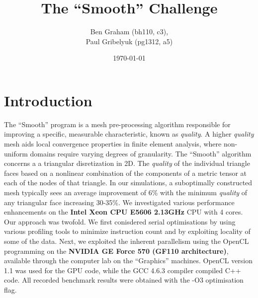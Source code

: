 \documentclass[a4paper,11pt, twocolumn]{article}
\author{
    Ben Graham (bh110, c3), \\
    Paul Gribelyuk (pg1312, a5)
}
\date{\today}
\title{The ``Smooth'' Challenge}
\begin{document}
\maketitle
\section{Introduction}
The ``Smooth'' program is a mesh pre-processing algorithm responsible for improving a specific, measurable characteristic, known as \emph{quality}.  A higher \emph{quality} mesh aids local convergence properties in finite element analysis, where non-uniform domains require varying degrees of granularity.  The ``Smooth'' algorithm concerns a a triangular disretization in 2D. The \emph{quality} of the individual triangle faces based on a nonlinear combination of the components of a metric tensor at each of the nodes of that triangle.  In our simulations, a suboptimally constructed mesh typically sees an average improvement of 6\% with the minimum \emph{quality} of any triangular face increasing 30-35\%.  We investigated various performance enhancements on the \textbf{Intel Xeon CPU E5606 2.13GHz} CPU with 4 cores.  Our approach was twofold.  We first conisdered serial optimisations by using various profiling tools to minimize instruction count and by exploiting locality of some of the data.   Next, we exploited the inherent parallelism using the OpenCL programming on the \textbf{NVIDIA GE Force 570 (GF110 architecture)}, available through the computer lab on the ``Graphics'' machines.  OpenCL version 1.1 was used for the GPU code, while the GCC 4.6.3 compiler compiled C++ code.  All recorded benchmark results were obtained with the -O3 optimisation flag.
\end{document}
